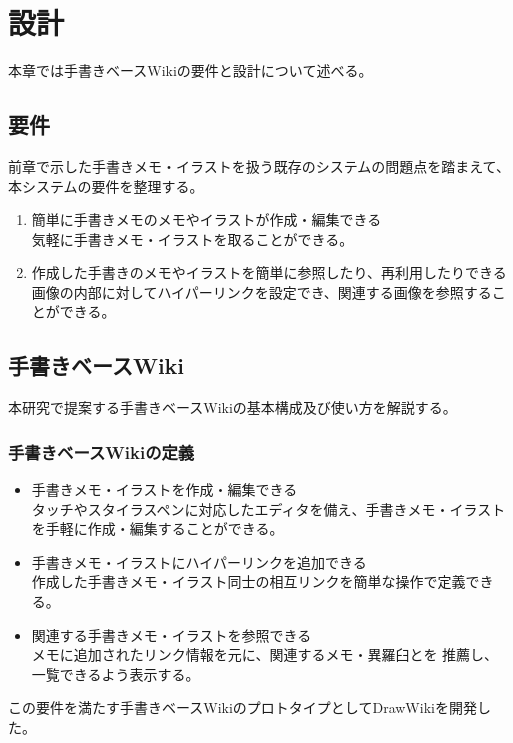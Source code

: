 \chapter{設計}
\label{chap:sekkei}

本章では手書きベースWikiの要件と設計について述べる。

\newpage

\section{要件}
前章で示した手書きメモ・イラストを扱う既存のシステムの問題点を踏まえて、本システムの要件を整理する。
\begin{enumerate}
    \item 簡単に手書きメモのメモやイラストが作成・編集できる\\
    気軽に手書きメモ・イラストを取ることができる。
    \item 作成した手書きのメモやイラストを簡単に参照したり、再利用したりできる\\
    画像の内部に対してハイパーリンクを設定でき、関連する画像を参照することができる。
\end{enumerate}

\section{手書きベースWiki}
本研究で提案する手書きベースWikiの基本構成及び使い方を解説する。

\subsection{手書きベースWikiの定義}
\begin{itemize}
    \item 手書きメモ・イラストを作成・編集できる\\
    タッチやスタイラスペンに対応したエディタを備え、手書きメモ・イラストを手軽に作成・編集することができる。
    \item 手書きメモ・イラストにハイパーリンクを追加できる \\
    作成した手書きメモ・イラスト同士の相互リンクを簡単な操作で定義できる。
    \item 関連する手書きメモ・イラストを参照できる \\
    メモに追加されたリンク情報を元に、関連するメモ・異羅臼とを
    推薦し、一覧できるよう表示する。
\end{itemize}
この要件を満たす手書きベースWikiのプロトタイプとしてDrawWikiを開発した。

